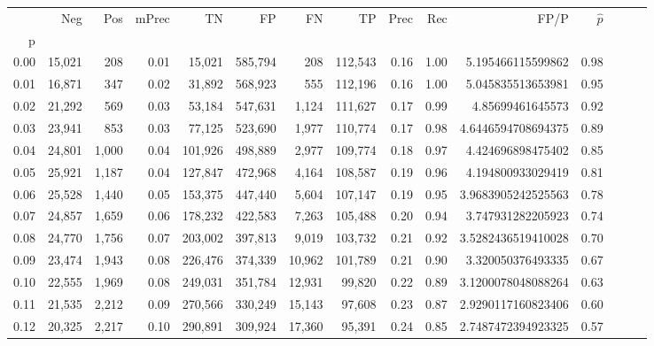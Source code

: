 \begin{tabular}{rrrrrrrrrrrrrrr}
\toprule
{} &     Neg &    Pos & mPrec &       TN &       FP &       FN &       TP &  Prec &   Rec &                  FP/P & $\hat{p}$ \\
p    &         &        &       &          &          &          &          &       &       &                       &           \\
\midrule
0.00 &  15,021 &    208 &  0.01 &   15,021 &  585,794 &      208 &  112,543 &  0.16 &  1.00 &     5.195466115599862 &      0.98 \\
0.01 &  16,871 &    347 &  0.02 &   31,892 &  568,923 &      555 &  112,196 &  0.16 &  1.00 &     5.045835513653981 &      0.95 \\
0.02 &  21,292 &    569 &  0.03 &   53,184 &  547,631 &    1,124 &  111,627 &  0.17 &  0.99 &      4.85699461645573 &      0.92 \\
0.03 &  23,941 &    853 &  0.03 &   77,125 &  523,690 &    1,977 &  110,774 &  0.17 &  0.98 &    4.6446594708694375 &      0.89 \\
0.04 &  24,801 &  1,000 &  0.04 &  101,926 &  498,889 &    2,977 &  109,774 &  0.18 &  0.97 &     4.424696898475402 &      0.85 \\
0.05 &  25,921 &  1,187 &  0.04 &  127,847 &  472,968 &    4,164 &  108,587 &  0.19 &  0.96 &     4.194800933029419 &      0.81 \\
0.06 &  25,528 &  1,440 &  0.05 &  153,375 &  447,440 &    5,604 &  107,147 &  0.19 &  0.95 &    3.9683905242525563 &      0.78 \\
0.07 &  24,857 &  1,659 &  0.06 &  178,232 &  422,583 &    7,263 &  105,488 &  0.20 &  0.94 &     3.747931282205923 &      0.74 \\
0.08 &  24,770 &  1,756 &  0.07 &  203,002 &  397,813 &    9,019 &  103,732 &  0.21 &  0.92 &    3.5282436519410028 &      0.70 \\
0.09 &  23,474 &  1,943 &  0.08 &  226,476 &  374,339 &   10,962 &  101,789 &  0.21 &  0.90 &     3.320050376493335 &      0.67 \\
0.10 &  22,555 &  1,969 &  0.08 &  249,031 &  351,784 &   12,931 &   99,820 &  0.22 &  0.89 &    3.1200078048088264 &      0.63 \\
0.11 &  21,535 &  2,212 &  0.09 &  270,566 &  330,249 &   15,143 &   97,608 &  0.23 &  0.87 &    2.9290117160823406 &      0.60 \\
0.12 &  20,325 &  2,217 &  0.10 &  290,891 &  309,924 &   17,360 &   95,391 &  0.24 &  0.85 &    2.7487472394923325 &      0.57 \\

\end{tabular}

